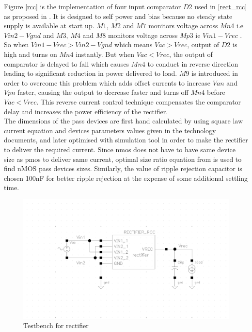 \documentclass[12pt,a4paper,UKenglish]{article}
\begin{document}
Figure \ref{rcc}  is the implementation of four input comparator $D2$ used in \ref{rect_rcc} as proposed in \cite{rectrcc}. It is designed to self power and bias because no steady state supply is available at start up. $M1$, $M2$ and $M7$ monitors voltage across $Mn4$ i.e $Vin2 - Vgnd$ and $M3$, $M4$ and $M8$ monitors voltage across $Mp3$ ie $Vin1 - Vrec$ . So when $Vin1 - Vrec > Vin2 - Vgnd$ which means $Vac > Vrec$, output of $D2$ is high and turns on $Mn4$ instantly. But when $Vac < Vrec$, the output of comparator is delayed to fall which causes $Mn4$ to conduct in reverse direction leading to significant reduction in power delivered to load. $M9$ is introduced in order to overcome this problem which adds offset currents to increase $Van$ and $Vpn$ faster, causing the output to decrease faster and turns off $Mn4$ before $Vac < Vrec$. This reverse current control technique compensates the comparator delay and increases the power efficiency of the rectifier. \\

The dimensions of the pass devices are first hand calculated by using square law current equation and devices parameters values given in the technology documents, and later optimised with simulation tool in order to make the rectifier to deliver the required current. Since \acrshort{nmos} does not have to have same device size as \acrshort{pmos} to deliver same current, optimal size ratio equation from \cite{rectsize} is used to find nMOS pass devices sizes.
Similarly, the value of ripple rejection capacitor is chosen 100nF for better ripple rejection at the expense of some additional settling time.

\begin{figure}[htbp] %
   \centering
   \includegraphics[width=.9\textwidth]{img/rectifier_testbench.png} 
   \caption{Testbench for rectifier}
   \label{rect_tb}
\end{figure}
\end{document}
